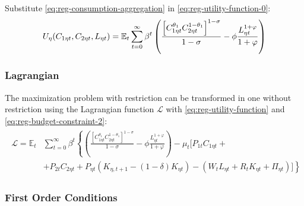 \documentclass[
	thesis.tex
	]{subfiles}
\begin{document}
Substitute \ref{eq:reg-consumption-aggregation} in \ref{eq:reg-utility-function-0}:
\begin{align}
	U_{\eta}(C_{1\eta t}, C_{2\eta t}, L_{\eta t}) = {\mathbb{E}_{t}} \sum_{t=0}^{\infty} \beta^t \left( \frac{\left[ C_{1\eta t}^{\theta_1} C_{2\eta t}^{1-\theta_1} \right]^{1-\sigma}}{1-\sigma} - \phi \frac{L_{\eta t}^{1+\varphi}}{1+\varphi} \right) \label{eq:reg-utility-function}
\end{align}

\subsubsection*{Lagrangian}

The maximization problem with restriction can be transformed in one without restriction using the Lagrangian function $\mathcal{L}$ with \ref{eq:reg-utility-function} and \ref{eq:reg-budget-constraint-2}:
\begin{align}
	\begin{split}
		\mathcal{L} = \mathbb{E}_t &\sum_{t=0}^{\infty} \beta^t \left\{ \left( \frac{ \left[ C_{1\eta t}^{\theta_1} C_{2\eta t}^{1-\theta_1} \right]^{1-\sigma}}{1-\sigma} - \phi \frac{L_{\eta t}^{1+\varphi}}{1+\varphi} \right) - \mu_t \Big[ P_{1t} C_{1\eta t} + \right. \\ & \left. + P_{2t} C_{2\eta t} + P_{\eta t} (K_{\eta, t+1} - (1-\delta)K_{\eta t}) -(W_t L_{\eta t} + R_t K_{\eta t} + \Pi_{\eta t}) \Big] \right\} \label{eq:reg-household-lagrangian}
	\end{split}
\end{align}


\subsubsection*{First Order Conditions}
\end{document}
